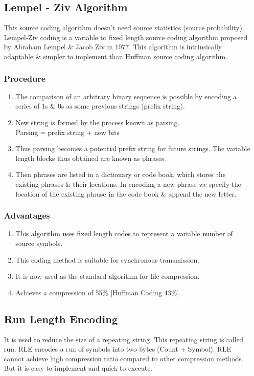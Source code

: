 \documentclass[12pt]{article}
\begin{document}
\subsection{Lempel - Ziv Algorithm}
This source coding algorithm doesn't need source statistics (source probability). Lempel-Ziv coding is a variable to fixed length source coding algorithm proposed by Abraham Lempel \& Jacob Ziv in 1977. This algorithm is intrinsically adaptable \& simpler to implement than Huffman source coding algorithm.

\subsubsection*{Procedure}
\begin{enumerate}
	\item The comparison of an arbitrary binary sequence is possible by encoding a series of 1s \& 0s as some previous strings (prefix string).
	\item New string is formed by the process known as parsing. \\
	      Parsing = prefix string + new bits
	\item Thus parsing becomes a potential prefix string for future strings. The variable length blocks thus obtained are known as phrases.
	\item Then phrases are listed in a dictionary or code book, which stores the existing phrases \& their locations. In encoding a new phrase we specify the location of the existing phrase in the code book \& append the new letter.
\end{enumerate}

\subsubsection*{Advantages}
\begin{enumerate}
	\item This algorithm uses fixed length codes to represent a variable number of source symbols.
	\item This coding method is suitable for synchronous transmission.
	\item It is now used as the standard algorithm for file compression.
	\item Achieves a compression of 55\% [Huffman Coding 43\%].
\end{enumerate}

\subsection{Run Length Encoding}
It is used to reduce the size of a repeating string. This repeating string is called run. RLE encodes a run of symbols into two bytes (Count + Symbol). RLE cannot achieve high compression ratio compared to other compression methods. But it is easy to implement and quick to execute.
\end{document}
